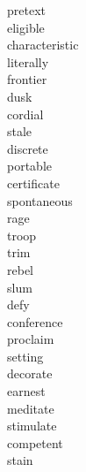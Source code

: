 \documentclass[a4paper, 10pt]{ctexart}
\begin{document}
\begin{multicols*}{2}
\begin{description}
\item[pretext]

\item[eligible]

\item[characteristic]

\item[literally]

\item[frontier]

\item[dusk]

\item[cordial]

\item[stale]

\item[discrete]

\item[portable]

\item[certificate]

\item[spontaneous]

\item[rage]

\item[troop]

\item[trim]

\item[rebel]

\item[slum]

\item[defy]

\item[conference]

\item[proclaim]

\item[setting]

\item[decorate]

\item[earnest]

\item[meditate]

\item[stimulate]

\item[competent]

\item[stain]


\end{description}
\end{multicols*}
\end{document}
